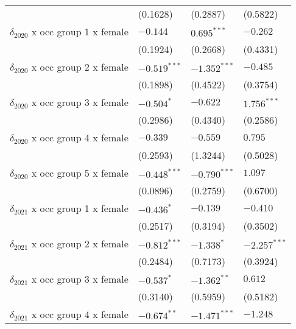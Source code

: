 \begin{tabular}{llll}
                                         &           (0.1628) &           (0.2887) &           (0.5822) \\
$\delta_{2020}$ x occ group 1 x female   &           $-0.144$ &      $0.695^{***}$ &           $-0.262$ \\
                                         &           (0.1924) &           (0.2668) &           (0.4331) \\
$\delta_{2020}$ x occ group 2 x female   &     $-0.519^{***}$ &     $-1.352^{***}$ &           $-0.485$ \\
                                         &           (0.1898) &           (0.4522) &           (0.3754) \\
$\delta_{2020}$ x occ group 3 x female   &         $-0.504^*$ &           $-0.622$ &      $1.756^{***}$ \\
                                         &           (0.2986) &           (0.4340) &           (0.2586) \\
$\delta_{2020}$ x occ group 4 x female   &           $-0.339$ &           $-0.559$ &            $0.795$ \\
                                         &           (0.2593) &           (1.3244) &           (0.5028) \\
$\delta_{2020}$ x occ group 5 x female   &     $-0.448^{***}$ &     $-0.790^{***}$ &            $1.097$ \\
                                         &           (0.0896) &           (0.2759) &           (0.6700) \\
$\delta_{2021}$ x occ group 1 x female   &         $-0.436^*$ &           $-0.139$ &           $-0.410$ \\
                                         &           (0.2517) &           (0.3194) &           (0.3502) \\
$\delta_{2021}$ x occ group 2 x female   &     $-0.812^{***}$ &         $-1.338^*$ &     $-2.257^{***}$ \\
                                         &           (0.2484) &           (0.7173) &           (0.3924) \\
$\delta_{2021}$ x occ group 3 x female   &         $-0.537^*$ &      $-1.362^{**}$ &            $0.612$ \\
                                         &           (0.3140) &           (0.5959) &           (0.5182) \\
$\delta_{2021}$ x occ group 4 x female   &      $-0.674^{**}$ &     $-1.471^{***}$ &           $-1.248$ \\

\end{tabular}
